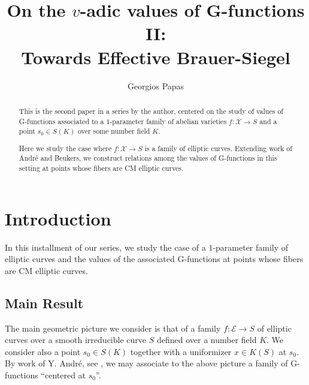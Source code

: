 \documentclass[12pt,twoside,a4paper]{article}
\title{On the $v$-adic values of G-functions II:\\
	\Large Towards Effective Brauer-Siegel}
\author{Georgios Papas}
\theoremstyle{plain}%
\newcommand{\CE}{\mathcal{E}}
\newcommand{\CX}{\mathcal{X}}
\begin{document}
	\maketitle
	
	\begin{abstract}This is the second paper in a series by the author, centered on the study of values of G-functions associated to a $1$-parameter family of abelian varieties $f:\CX\rightarrow S$ and a point $s_0\in S(K)$ over some number field $K$. 
		
		Here we study the case where $f:\CX\rightarrow S$ is a family of elliptic curves. Extending work of Andr\'e and Beukers, we construct relations among the values of G-functions in this setting at points whose fibers are CM elliptic curves.\end{abstract}
	
\section{Introduction}
In this installment of our series, we study the case of a $1$-parameter family of elliptic curves and the values of the associated G-functions at points whose fibers are CM elliptic curves. 
 
\subsection{Main Result}

The main geometric picture we consider is that of a family $f:\CE\rightarrow S$ of elliptic curves over a smooth irreducible curve $S$ defined over a number field $K$. We consider also a point $s_0\in S(K)$ together with a uniformizer $x\in K(S)$ at $s_0$. By work of Y. Andr\'e, see \cite{andre1989g}, we may associate to the above picture a family of G-functions ``centered at $s_0$''.
\end{document}
